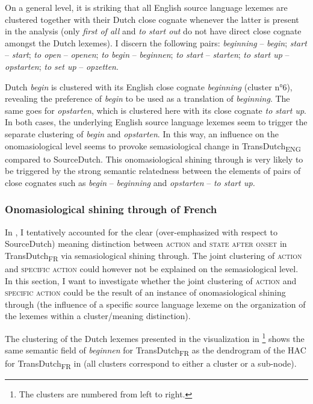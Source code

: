 On a general level, it is striking that all English source language lexemes are clustered together with their Dutch close cognate whenever the latter is present in the analysis (only \textit{first of all} and \textit{to start out} do not have direct close cognate amongst the Dutch lexemes). I discern the following pairs: \textit{beginning} -- \textit{begin}; \textit{start} -- \textit{start}; \textit{to open} -- \textit{openen}; \textit{to begin} -- \textit{beginnen}; \textit{to start} -- \textit{starten}; \textit{to start up} -- \textit{opstarten}; \textit{to set up} -- \textit{opzetten}.

Dutch \textit{begin} is clustered with its English close cognate \textit{beginning} (cluster n°6), revealing the preference of \textit{begin} to be used as a translation of \textit{beginning}. The same goes for \textit{opstarten}, which is clustered here with its close cognate \textit{to start up}. In both cases, the underlying English source language lexemes seem to trigger the separate clustering of \textit{begin} and \textit{opstarten}. In this way, an influence on the onomasiological level seems to provoke semasiological change in TransDutch\textsubscript{ENG} compared to SourceDutch. This onomasiological shining through is very likely to be triggered by the strong semantic relatedness between the elements of pairs of close cognates such as \textit{begin} -- \textit{beginning} and \textit{opstarten} -- \textit{to start up.}

\subsubsection{Onomasiological shining through of French}
\label{sec:4.6.2.2}  
In , I tentatively accounted for the clear (over-emphasized with respect to SourceDutch) meaning distinction between \textsc{action} and \textsc{state after onset} in TransDutch\textsubscript{FR} via semasiological shining through. The joint clustering of \textsc{action} and {\textsc{specific}} \textsc{action} could however not be explained on the semasiological level. In this section, I want to investigate whether the joint clustering of \textsc{action} and {\textsc{specific}} \textsc{action} could be the result of an instance of onomasiological shining through (the influence of a specific source language lexeme on the organization of the lexemes within a cluster\slash meaning distinction).

The clustering of the Dutch lexemes presented in the visualization in \footnote{The clusters are numbered from left to right.} shows the same semantic field of \textit{beginnen} for TransDutch\textsubscript{FR} as the dendrogram of the HAC for TransDutch\textsubscript{FR} in  (all clusters correspond to either a cluster or a sub-node).

